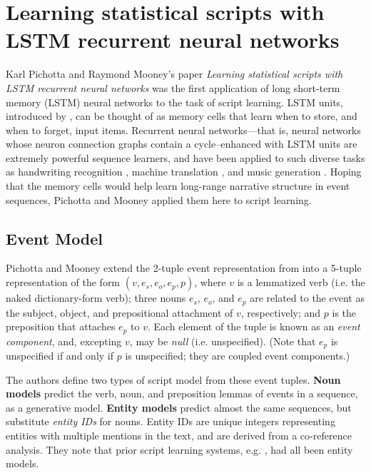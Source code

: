\section{Learning statistical scripts with LSTM recurrent neural networks}
\label{sec:pichotta}

Karl Pichotta and Raymond Mooney's paper \textit{Learning statistical scripts with LSTM recurrent neural networks} \citep{pichotta2016learning} was the first application of long short-term memory (LSTM) neural networks to the task of script learning. LSTM units, introduced by \citep{lstms}, can be thought of as memory cells that learn when to store, and when to forget, input items. Recurrent neural networks---that is, neural networks whose neuron connection graphs contain a cycle--enhanced with LSTM units are extremely powerful sequence learners, and have been applied to such diverse tasks as handwriting recognition \citep{graves2009offline}, machine translation \citep{sutskever2014sequence}, and music generation \citep{eck2002finding}. Hoping that the memory cells would help learn long-range narrative structure in event sequences, Pichotta and Mooney applied them here to script learning.

\subsection{Event Model}

Pichotta and Mooney extend the 2-tuple event representation from \citep{chambers2008unsupervised} into a 5-tuple representation of the form $(v, e_{s}, e_{o}, e_{p}, p)$, where $v$ is a lemmatized verb (i.e. the naked dictionary-form verb); three nouns $e_{s}$, $e_{o}$, and $e_{p}$ are related to the event as the subject, object, and prepositional attachment of $v$, respectively; and $p$ is the preposition that attaches $e_{p}$ to $v$. Each element of the tuple is known as an \textit{event component}, and, excepting $v$, may be \textit{null} (i.e. unspecified). (Note that $e_{p}$ is unspecified if and only if $p$ is unspecified; they are coupled event components.)

The authors define two types of script model from these event tuples. \textbf{Noun models} predict the verb, noun, and preposition lemmas of events in a sequence, as a generative model. \textbf{Entity models} predict almost the same sequences, but substitute \textit{entity IDs} for nouns. Entity IDs are unique integers representing entities with multiple mentions in the text, and are derived from a co-reference analysis. They note that prior script learning systems, e.g. \citep{chambers2008unsupervised}, had all been entity models.

